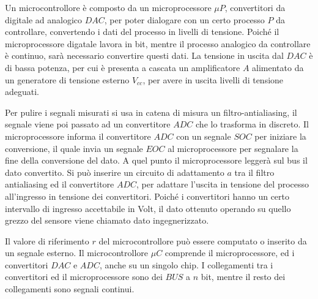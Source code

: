 \documentclass{article}
\numberwithin{equation}{subsection}
\begin{document}
Un microcontrollore è composto da un microprocessore $\mu P$, convertitori da digitale ad analogico $DAC$, per poter dialogare con un certo processo $P$ da controllare, 
convertendo i dati del processo in livelli di tensione. Poiché il microprocessore digatale lavora in bit, mentre il processo analogico da controllare è continuo, sarà 
necessario convertire questi dati. La tensione in uscita dal $DAC$ è di bassa potenza, per cui è presenta a cascata un amplificatore $A$ alimentato da un 
generatore di tensione esterno $V_{cc}$, per avere in uscita livelli di tensione adeguati. 



Per pulire i segnali misurati si usa in catena di misura un filtro-antialiasing, il segnale viene poi passato ad un convertitore $ADC$ che lo trasforma in discreto. 
Il microprocessore informa il convertitore 
$ADC$ con un segnale $SOC$ per iniziare la conversione, il quale invia un segnale $EOC$ al microprocessore per segnalare la fine della conversione del dato. A quel punto 
il microprocessore leggerà sul bus il dato convertito. Si può inserire un circuito di adattamento $a$ tra il filtro antialiasing ed il convertitore $ADC$, per adattare 
l'uscita in tensione del processo all'ingresso in tensione dei convertitori. Poiché i convertitori hanno un certo intervallo di ingresso accettabile in Volt, il dato 
ottenuto operando su quello grezzo del sensore viene chiamato dato ingegnerizzato. 



Il valore di riferimento $r$ del microcontrollore può essere computato o inserito da un segnale esterno. Il microcontrollore $\mu C$ comprende il microprocessore, ed i convertitori 
$DAC$ e $ADC$, anche su un singolo chip. I collegamenti tra i convertitori ed il microprocessore sono dei $BUS$ a $n$ bit, mentre il resto dei collegamenti sono 
segnali continui. 
\end{document}
